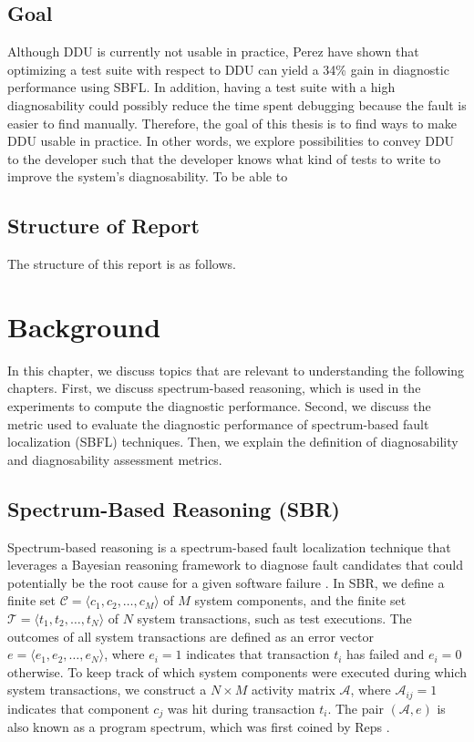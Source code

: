 \documentclass[twoside,a4paper,11pt]{memoir}
\begin{document}
\section{Goal}
Although DDU is currently not usable in practice, Perez \etal \cite{DBLP:conf/icse/PerezAD17} have shown that optimizing a test suite with respect to DDU can yield a 34\% gain in diagnostic performance using SBFL.
In addition, having a test suite with a high diagnosability could possibly reduce the time spent debugging because the fault is easier to find manually.
Therefore, the goal of this thesis is to find ways to make DDU usable in practice.
In other words, we explore possibilities to convey DDU to the developer such that the developer knows what kind of tests to write to improve the system's diagnosability.
To be able to


\section{Structure of Report}
The structure of this report is as follows.

\chapter{Background}
\label{ch:background}

In this chapter, we discuss topics that are relevant to understanding the following chapters.
First, we discuss spectrum-based reasoning, which is used in the experiments to compute the diagnostic performance.
Second, we discuss the metric used to evaluate the diagnostic performance of spectrum-based fault localization (SBFL) techniques.
Then, we explain the definition of diagnosability and diagnosability assessment metrics.

\section{Spectrum-Based Reasoning (SBR)}
Spectrum-based reasoning is a spectrum-based fault localization technique that leverages a Bayesian reasoning framework to diagnose fault candidates that could potentially be the root cause for a given software failure \cite{abreu2009spectrum}.
In SBR, we define a finite set $\mathcal{C} = \langle c_1, c_2, \ldots, c_M \rangle$ of $M$ system components, and the finite set $\mathcal{T} = \langle t_1, t_2, \ldots, t_N \rangle$ of $N$ system transactions, such as test executions.
The outcomes of all system transactions are defined as an error vector $e = \langle e_1, e_2, \ldots, e_N \rangle$, where $e_i = 1$ indicates that transaction $t_i$ has failed and $e_i = 0$ otherwise.
To keep track of which system components were executed during which system transactions, we construct a $N \times M$ activity matrix $\mathcal{A}$, where $\mathcal{A}_{ij} = 1$ indicates that component $c_j$ was hit during transaction $t_i$.
The pair $(\mathcal{A}, e)$ is also known as a program spectrum, which was first coined by Reps \etal \cite{reps1997use}.
\end{document}
